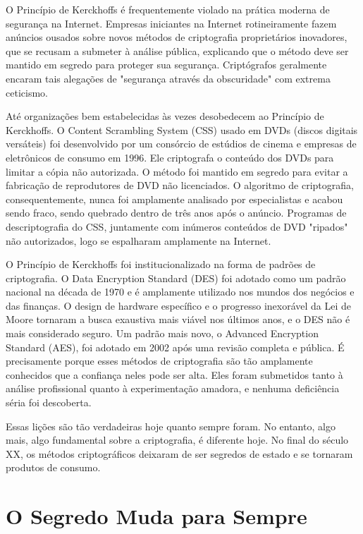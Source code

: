 \documentclass{book}
\begin{document}
O Princípio de Kerckhoffs é frequentemente violado na prática moderna de segurança na Internet. Empresas iniciantes na Internet rotineiramente fazem anúncios ousados sobre novos métodos de criptografia proprietários inovadores, que se recusam a submeter à análise pública, explicando que o método deve ser mantido em segredo para proteger sua segurança. Criptógrafos geralmente encaram tais alegações de "segurança através da obscuridade" com extrema ceticismo.

Até organizações bem estabelecidas às vezes desobedecem ao Princípio de Kerckhoffs. O Content Scrambling System (CSS) usado em DVDs (discos digitais versáteis) foi desenvolvido por um consórcio de estúdios de cinema e empresas de eletrônicos de consumo em 1996. Ele criptografa o conteúdo dos DVDs para limitar a cópia não autorizada. O método foi mantido em segredo para evitar a fabricação de reprodutores de DVD não licenciados. O algoritmo de criptografia, consequentemente, nunca foi amplamente analisado por especialistas e acabou sendo fraco, sendo quebrado dentro de três anos após o anúncio. Programas de descriptografia do CSS, juntamente com inúmeros conteúdos de DVD "ripados" não autorizados, logo se espalharam amplamente na Internet.

O Princípio de Kerckhoffs foi institucionalizado na forma de padrões de criptografia. O Data Encryption Standard (DES) foi adotado como um padrão nacional na década de 1970 e é amplamente utilizado nos mundos dos negócios e das finanças. O design de hardware específico e o progresso inexorável da Lei de Moore tornaram a busca exaustiva mais viável nos últimos anos, e o DES não é mais considerado seguro. Um padrão mais novo, o Advanced Encryption Standard (AES), foi adotado em 2002 após uma revisão completa e pública. É precisamente porque esses métodos de criptografia são tão amplamente conhecidos que a confiança neles pode ser alta. Eles foram submetidos tanto à análise profissional quanto à experimentação amadora, e nenhuma deficiência séria foi descoberta.

Essas lições são tão verdadeiras hoje quanto sempre foram. No entanto, algo mais, algo fundamental sobre a criptografia, é diferente hoje. No final do século XX, os métodos criptográficos deixaram de ser segredos de estado e se tornaram produtos de consumo.


\section{O Segredo Muda para Sempre}
\label{segredos:muda}
\end{document}
